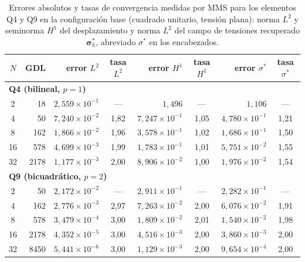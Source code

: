 \begin{table}[htbp]
\centering
\caption[Errores absolutos y tasas de convergencia medidas por MMS (configuración base).]{Errores absolutos y tasas de convergencia medidas por MMS para los elementos Q4 y Q9 en la configuración base (cuadrado unitario, tensión plana): norma $L^2$ y seminorma $H^1$ del desplazamiento y norma $L^2$ del campo de tensiones recuperado $\bm{\sigma}^*_h$, abreviado $\sigma^*$ en los encabezados.}
\label{tab:mms}
\small
\setlength{\tabcolsep}{4pt}
\begin{tabular}{c r r c r c r c}
\hline
$N$ & GDL & error $L^2$ & tasa $L^2$ & error $H^1$ & tasa $H^1$ & error $\sigma^*$ & tasa $\sigma^*$ \\
\hline
\multicolumn{8}{l}{\textbf{Q4 (bilineal, $p=1$)}} \\
2  & 18   & $2{,}559\times10^{-1}$ & ---  & $1{,}496$               & ---  & $1{,}106$              & ---  \\
4  & 50   & $7{,}240\times10^{-2}$ & 1,82 & $7{,}247\times10^{-1}$  & 1,05 & $4{,}780\times10^{-1}$ & 1,21 \\
8  & 162  & $1{,}866\times10^{-2}$ & 1,96 & $3{,}578\times10^{-1}$  & 1,02 & $1{,}686\times10^{-1}$ & 1,50 \\
16 & 578  & $4{,}699\times10^{-3}$ & 1,99 & $1{,}783\times10^{-1}$  & 1,01 & $5{,}751\times10^{-2}$ & 1,55 \\
32 & 2178 & $1{,}177\times10^{-3}$ & 2,00 & $8{,}906\times10^{-2}$  & 1,00 & $1{,}976\times10^{-2}$ & 1,54 \\
\hline
\multicolumn{8}{l}{\textbf{Q9 (bicuadrático, $p=2$)}} \\
2  & 50   & $2{,}172\times10^{-2}$ & ---  & $2{,}911\times10^{-1}$  & ---  & $2{,}282\times10^{-1}$ & ---  \\
4  & 162  & $2{,}776\times10^{-3}$ & 2,97 & $7{,}263\times10^{-2}$  & 2,00 & $6{,}076\times10^{-2}$ & 1,91 \\
8  & 578  & $3{,}479\times10^{-4}$ & 3,00 & $1{,}809\times10^{-2}$  & 2,01 & $1{,}540\times10^{-2}$ & 1,98 \\
16 & 2178 & $4{,}352\times10^{-5}$ & 3,00 & $4{,}516\times10^{-3}$  & 2,00 & $3{,}860\times10^{-3}$ & 2,00 \\
32 & 8450 & $5{,}441\times10^{-6}$ & 3,00 & $1{,}129\times10^{-3}$  & 2,00 & $9{,}654\times10^{-4}$ & 2,00 \\
\hline
\end{tabular}
{\singlespacing{}}
\end{table}

